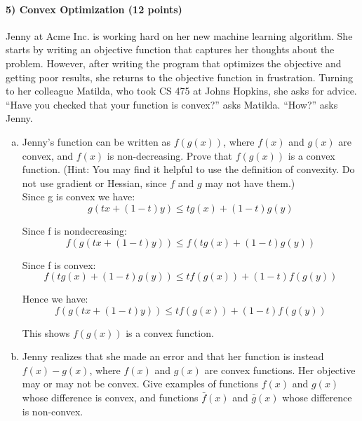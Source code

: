 \documentclass[11pt]{article}
\begin{document}
\paragraph{5) Convex Optimization (12 points)}
Jenny at Acme Inc. is working hard on her new machine learning algorithm. She starts by writing an objective function
that captures her thoughts about the problem. However, after writing the program that optimizes the objective
and getting poor results, she returns to the objective function in frustration. Turning to her colleague Matilda,
who took CS 475 at Johns Hopkins, she asks for advice. ``Have you checked that your function is convex?'' asks Matilda.
``How?'' asks Jenny.
\begin{enumerate}[(a)]
\item Jenny's function can be written as $f(g(x))$, where $f(x)$ and $g(x)$ are convex, and $f(x)$ is non-decreasing. Prove that $f(g(x))$ is a convex function. (Hint: You may find it helpful to use the definition of convexity. Do not use gradient or Hessian, since $f$ and $g$ may not have them.)\\

Since g is convex we have:
	\begin{equation*}
		g(tx + (1-t)y) \leq t g(x) + (1-t) g(y) 
	\end{equation*}

Since f is nondecreasing:
	\begin{equation*}
		f(g(tx + (1-t)y)) \leq f(t g(x) + (1-t) g(y)) 
	\end{equation*}

Since f is convex:
	\begin{equation*}
		f(t g(x) + (1-t) g(y)) \leq t f(g(x)) + (1-t) f(g(y))
	\end{equation*}
	
Hence we have:
	\begin{equation*}
		f(g(tx + (1-t)y)) \leq t f(g(x)) + (1-t) f(g(y))
	\end{equation*}
	
This shows $f(g(x))$ is a convex function.
	
\item Jenny realizes that she made an error and that her function is instead
$f(x)-g(x)$, where $f(x)$ and $g(x)$ are convex functions. Her objective may or may not be convex. Give examples of functions $f(x)$ and $g(x)$ whose difference is convex, and functions $\bar{f}(x)$ and $\bar{g}(x)$ whose difference is non-convex.
\end{enumerate}
\end{document}
